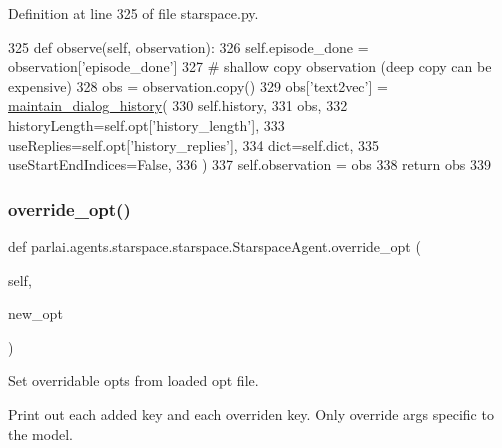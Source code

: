 Definition at line 325 of file starspace.\+py.


\begin{DoxyCode}
325     \textcolor{keyword}{def }observe(self, observation):
326         self.episode\_done = observation[\textcolor{stringliteral}{'episode\_done'}]
327         \textcolor{comment}{# shallow copy observation (deep copy can be expensive)}
328         obs = observation.copy()
329         obs[\textcolor{stringliteral}{'text2vec'}] = \hyperlink{namespaceparlai_1_1agents_1_1legacy__agents_1_1seq2seq_1_1utils__v0_ac7cb3ffae208474d6e67f37ecfe07f64}{maintain\_dialog\_history}(
330             self.history,
331             obs,
332             historyLength=self.opt[\textcolor{stringliteral}{'history\_length'}],
333             useReplies=self.opt[\textcolor{stringliteral}{'history\_replies'}],
334             dict=self.dict,
335             useStartEndIndices=\textcolor{keyword}{False},
336         )
337         self.observation = obs
338         \textcolor{keywordflow}{return} obs
339 
\end{DoxyCode}
\mbox{\label{classparlai_1_1agents_1_1starspace_1_1starspace_1_1StarspaceAgent_ab75a17fe54cbc5ba074ca2df457235d4}} 
\subsubsection{\texorpdfstring{override\+\_\+opt()}{override\_opt()}}
{\footnotesize\ttfamily def parlai.\+agents.\+starspace.\+starspace.\+Starspace\+Agent.\+override\+\_\+opt (\begin{DoxyParamCaption}\item[{}]{self,  }\item[{}]{new\+\_\+opt }\end{DoxyParamCaption})}

\begin{DoxyVerb}Set overridable opts from loaded opt file.

Print out each added key and each overriden key. Only override args specific to
the model.
\end{DoxyVerb}
 

